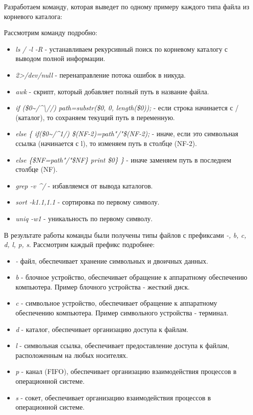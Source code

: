 \documentclass[14pt,a4paper,report]{report}
\begin{document}
Разработаем команду, которая выведет по одному примеру каждого типа файла из корневого каталога:



Рассмотрим команду подробно:

\begin{itemize}
	\item \emph{ls / -l -R} - устанавливаем рекурсивный поиск по корневому каталогу с выводом полной информации.
	\item \emph{2>/dev/null} - перенаправление потока ошибок в никуда.
	\item \emph{awk} - скрипт, который добавляет полный путь в название файла.
	\item \emph{if (\$0\textasciitilde/\textasciicircum\textbackslash//) path=substr(\$0, 0, length(\$0)); } - если строка начинается с / (каталог), то сохраняем текущий путь в переменную.
	\item \emph{else \{ if(\$0\textasciitilde/\textasciicircum1/) \$(NF-2)=path"/"\$(NF-2);} - иначе, если это символьная ссылка (начинается с l), то изменяем путь в столбце (NF-2).
	\item \emph{else \{\$NF=path"/"\$NF\} print \$0\} \} } - иначе заменяем путь в последнем столбце (NF).
	\item \emph{grep -v \textasciicircum/} - избавляемся от вывода каталогов.
	\item \emph{sort -k1.1,1.1} - сортировка по первому символу.
	\item \emph{uniq -w1} - уникальность по первому символу.
\end{itemize}

\clearpage

В результате работы команды были получены типы файлов с префиксами \emph{-, b, c, d, l, p, s}. Рассмотрим каждый префикс подробнее:

\begin{itemize}
	\item \emph{-} файл, обеспечивает хранение символьных и двоичных данных.
	\item \emph{b} - блочное устройство, обеспечивает обращение к аппаратному обеспечению компьютера. Пример блочного устройства - жесткий диск.
	\item \emph{c} - символьное устройство, обеспечивает обращение к аппаратному обеспечению компьютера. Пример символьного устройства - терминал.
	\item \emph{d} - каталог, обеспечивает организацию доступа к файлам.
	\item \emph{l} - символьная ссылка, обеспечивает предоставление доступа к файлам, расположенным на любых носителях.
	\item \emph{p} - канал (FIFO), обеспечивает организацию взаимодействия процессов в операционной системе.
	\item \emph{s} - сокет, обеспечивает организацию взаимодействия процессов в операционной системе.
\end{itemize}
\end{document}
